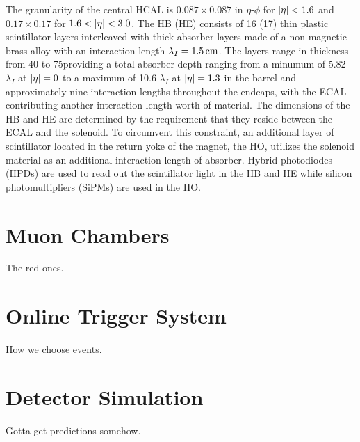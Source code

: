 The granularity of the central HCAL is $0.087\times0.087$ in $\eta$-$\phi$ for $\lvert \eta \rvert<1.6$ and $0.17\times0.17$ for $1.6 < \lvert \eta \rvert < 3.0$.
The HB (HE) consists of 16 (17) thin plastic scintillator layers interleaved with thick absorber layers made of a non-magnetic brass alloy with an interaction length $\lambda_I = 1.5\,\text{cm}$.
The layers range in thickness from 40 to 75\mm providing a total absorber depth ranging from a minumum of 5.82 $\lambda_I$ at $\lvert \eta \rvert=0$ to a maximum of 10.6 $\lambda_I$ at $\lvert \eta \rvert = 1.3$ in the barrel and approximately nine interaction lengths throughout the endcaps, with the ECAL contributing another interaction length worth of material.
The dimensions of the HB and HE are determined by the requirement that they reside between the ECAL and the solenoid. 
To circumvent this constraint, an additional layer of scintillator located in the return yoke of the magnet, the HO, utilizes the solenoid material as an additional interaction length of absorber.
Hybrid photodiodes (HPDs) are used to read out the scintillator light in the HB and HE while silicon photomultipliers (SiPMs) are used in the HO.

\section{Muon Chambers}

The red ones.

\section{Online Trigger System}

How we choose events.

\section{Detector Simulation}

Gotta get predictions somehow.



